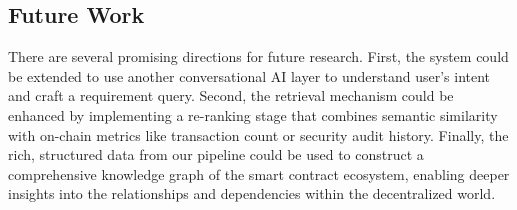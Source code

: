 \subsection{Future Work}
There are several promising directions for future research. First, the system could be extended to use another conversational AI layer to understand user's intent and craft a requirement query. Second, the retrieval mechanism could be enhanced by implementing a re-ranking stage that combines semantic similarity with on-chain metrics like transaction count or security audit history. Finally, the rich, structured data from our pipeline could be used to construct a comprehensive knowledge graph of the smart contract ecosystem, enabling deeper insights into the relationships and dependencies within the decentralized world.